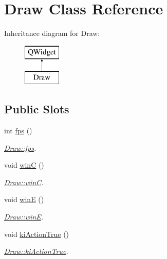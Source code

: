 \hypertarget{class_draw}{}\section{Draw Class Reference}
\label{class_draw}
Inheritance diagram for Draw\+:\begin{figure}[H]
\begin{center}
\leavevmode
\includegraphics[height=2.000000cm]{class_draw}
\end{center}
\end{figure}
\subsection*{Public Slots}
\begin{DoxyCompactItemize}
\item 
int \hyperlink{class_draw_a4e01f0c9c841a83b86cee5f35b4041a2}{fps} ()
\begin{DoxyCompactList}\small\item\em \hyperlink{class_draw_a4e01f0c9c841a83b86cee5f35b4041a2}{Draw\+::fps}. \end{DoxyCompactList}\item 
void \hyperlink{class_draw_a706414ad08bb093ccd2bcd61e12dabe1}{win\+C} ()
\begin{DoxyCompactList}\small\item\em \hyperlink{class_draw_a706414ad08bb093ccd2bcd61e12dabe1}{Draw\+::win\+C}. \end{DoxyCompactList}\item 
void \hyperlink{class_draw_ac63e4e142c5a594016d51a80f7de5194}{win\+E} ()
\begin{DoxyCompactList}\small\item\em \hyperlink{class_draw_ac63e4e142c5a594016d51a80f7de5194}{Draw\+::win\+E}. \end{DoxyCompactList}\item 
void \hyperlink{class_draw_a16841fa2b2ccda01f1e90d657d4427bc}{ki\+Action\+True} ()
\begin{DoxyCompactList}\small\item\em \hyperlink{class_draw_a16841fa2b2ccda01f1e90d657d4427bc}{Draw\+::ki\+Action\+True}. \end{DoxyCompactList}\end{DoxyCompactItemize}
